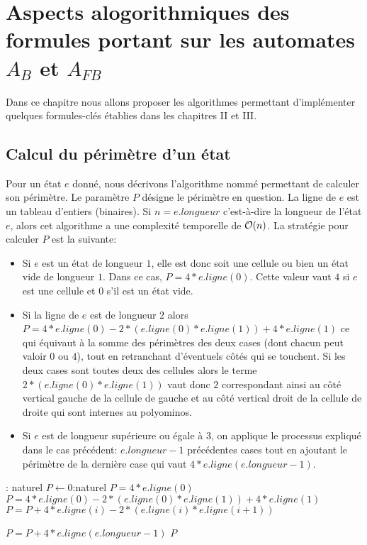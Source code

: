 \chapter{Aspects alogorithmiques des formules portant sur les automates $A_{B}$ et $A_{FB}$}

Dans ce chapitre nous allons proposer les algorithmes permettant d'implémenter quelques formules-clés établies dans les chapitres II et III. 
\section{Calcul du périmètre d'un état}
Pour un état $e$ donné, nous décrivons l'algorithme nommé  permettant de calculer son périmètre. Le paramètre $P$ désigne le périmètre en question. La ligne de $e$ est un tableau d'entiers (binaires). Si $n = e.longueur$ c'est-à-dire la longueur de l'état $e$, alors cet algorithme a une complexité temporelle de $\mathcal{O}(n)$.
La stratégie pour calculer $P$ est la suivante:
\begin{itemize}
\item Si $e$ est un état de longueur $1$, elle est donc soit une cellule ou bien un état vide de longueur $1$.  Dans ce cas, $P= 4*e.ligne(0)$. Cette valeur vaut $4$ si $e$ est une cellule et $0$ s'il est un état vide.
\item Si la ligne de $e$ est de longueur $2$ alors $P=4*e.ligne(0)-2*(e.ligne(0)*e.ligne(1)) +   4*e.ligne(1)$   ce qui équivaut à la somme des périmètres des deux cases (dont chacun peut valoir $0$ ou $4$), tout en retranchant d'éventuels côtés  qui se touchent. Si les deux cases sont toutes deux des cellules alors le terme $2*(e.ligne(0)*e.ligne(1)) $ vaut donc $2$ correspondant ainsi au côté vertical gauche de la cellule de gauche et au côté vertical  droit de la cellule de droite qui sont internes au polyominos.
\item Si $e$ est de longueur supérieure ou égale à $3$, on applique le processus expliqué dans le cas précédent: $e.longueur -1$ précédentes cases tout en ajoutant le périmètre de la dernière case qui vaut $4*e.ligne(e.longueur-1)$.
\end{itemize}
\begin{algorithmic}[1]
 : naturel
   \State $P\leftarrow 0$:naturel
    	\State $P= 4*e.ligne(0)$
          \Else
    		   \State $P=4*e.ligne(0)-2*(e.ligne(0)*e.ligne(1)) +   4*e.ligne(1)$
    	\Else
                 \State $P= P+4*e.ligne(i)-2*(e.ligne(i)*e.ligne(i+1))$
                 
            \EndFor
            \State $P=P+ 4*e.ligne(e.longueur-1)$  
           \EndIf	
    \EndIf
         \State \Return $P$
   \EndFunction
  \end{algorithmic}


